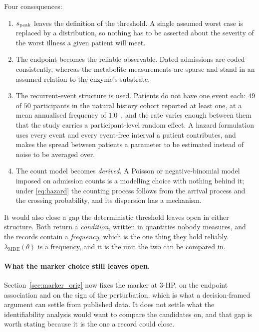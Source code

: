 Four consequences:

\begin{enumerate}[leftmargin=*, itemsep=2pt]
\item $s_{\mathrm{peak}}$ leaves the definition of the threshold. A single assumed worst case is
      replaced by a distribution, so nothing has to be asserted about the severity of the
      worst illness a given patient will meet.
\item The endpoint becomes the reliable observable. Dated admissions are coded
      consistently, whereas the metabolite measurements are sparse and stand in an assumed
      relation to the enzyme's substrate.
\item The recurrent-event structure is used. Patients do not have one
      event each: $49$ of $50$ participants in the natural history cohort reported at least
      one, at a mean annualised frequency of $1.0$~\cite{natural_history}, %
      and the rate varies enough between them that the study carries a participant-level
      random effect. A hazard formulation uses every event and every event-free interval a
      patient contributes, and makes the spread between patients a parameter to be estimated
      instead of noise to be averaged over.
\item The count model becomes \emph{derived}. A Poisson or
      negative-binomial model imposed on admission counts is a modelling choice with
      nothing behind it; under \eqref{eq:hazard} the counting process follows from the
      arrival process and the crossing probability, and its dispersion has a mechanism.
\end{enumerate}

It would also close a gap the deterministic threshold leaves open in either structure. Both
return a \emph{condition}, written in quantities nobody measures, and the records contain a
\emph{frequency}, which is the one thing they hold reliably. $\lambda_{\mathrm{MDE}}(\theta)$
is a frequency, and it is the unit the two can be compared in.

\paragraph{What the marker choice still leaves open.} Section~\ref{sec:marker_orig} now fixes the
marker at 3-HP, on the endpoint association and on the sign of the perturbation, which is
what a decision-framed argument can settle from published data. It does not settle what the
identifiability analysis would want to compare the candidates on, and that gap is worth
stating because it is the one a record could close.

